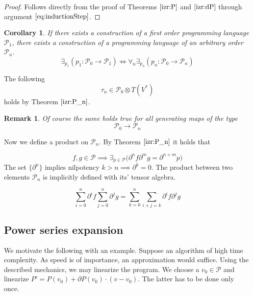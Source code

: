 \documentclass{article}
\newcommand{\dP}{\mathcal{P}}
\newcommand{\D}{\partial}
\newcommand{\sumd}{\tau}
\newtheorem{opomba}{Remark}[section]
\newtheorem{corollary}{Corollary}[section]
\begin{document}
 \begin{proof} Follows directly from the proof of Theorems $\ref{izr:P}$ and $\ref{izr:dP}$ through argument $\eqref{eq:inductionStep}$.
  \end{proof}
  \begin{corollary}
  If there exists a construction of a first order programming language $\dP_1$, there exists a construction of a programming language of an arbitrary order $\dP_n$.
  \begin{equation}
  \exists_{p_1}(p_1:\dP_0\to\dP_1)\iff\forall_n\exists_{p_n}(p_n:\dP_0\to\dP_n)
  \end{equation}
  \end{corollary}
     
    The following
     \begin{equation}
     	\sumd_n\in\dP_0\otimes T(V^*)
     \end{equation}
   	holds by Theorem $\ref{izr:P_n}$.
        \begin{opomba}
        Of course the same holds true for all generating maps of the type
        $$\dP_0\to\dP_n$$
        \end{opomba}

Now we define a product on $\dP_n$. By Theorem $\ref{izr:P_n}$ it holds that

\begin{equation}
	f,g\in\dP\implies\exists_{p\in\dP}\Big(\D^nf\D^mg=\D^{n+m}p\Big)
\end{equation}
The set $\{\D^n\}$ implies nilpotency $k>n\implies\D^k=0$. The product between two elements $\dP_n$ is implicitly defined with its' tensor algebra. 

\begin{equation}\label{eq:P_prod}
	\sum\limits_{i=0}^{n}\D^if\sum\limits_{j=0}^{n}\D^jg=\sum\limits_{k=0}^{n}\sum\limits_{i+j=k}\D^if\D^jg
\end{equation}

 \subsection{Power series expansion}\label{sec:Vrsta}
 
We motivate the following with an example. Suppose an algorithm of high time complexity. As speed is of importance, an approximation would suffice. Using the described mechanics, we may linearize the program. We choose a $v_0\in\dP$ and linearize $P'=P(v_0)+\D P(v_0)\cdot(v-v_0)$. The latter has to be done only once.
 
\end{document}
